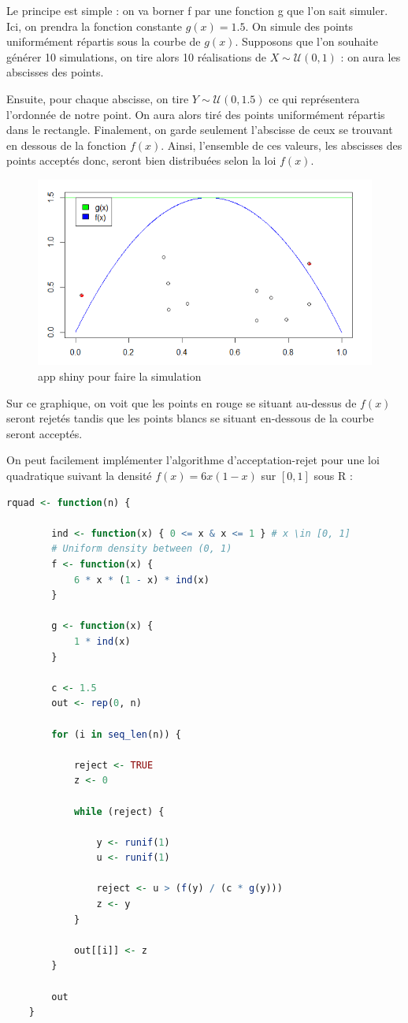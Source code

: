 \documentclass[10pt]{article} %
\begin{document}
Le principe est simple : on va borner f par une fonction g que l'on sait simuler. Ici, on prendra la fonction constante $g(x) = 1.5 $. On simule des points uniformément répartis sous la courbe de $g(x)$. Supposons que l'on souhaite générer 10 simulations, on tire alors 10 réalisations de $X \sim \mathcal{U}(0, 1)$ : on aura les abscisses des points.

Ensuite, pour chaque abscisse, on tire $Y \sim \mathcal{U}(0, 1.5)$ ce qui représentera l'ordonnée de notre point. On aura alors tiré des points uniformément répartis dans le rectangle. Finalement, on garde seulement l'abscisse de ceux se trouvant en dessous de la fonction $f(x)$. Ainsi, l'ensemble de ces valeurs, les abscisses des points acceptés donc, seront bien distribuées selon la loi $f(x)$.

\begin{figure}[h!]
    \centering
    \includegraphics[width=.7\linewidth]{media/graph_acceptation_rejet.png}
    \caption{app shiny pour faire la simulation}
\end{figure}

Sur ce graphique, on voit que les points en rouge se situant au-dessus de $f(x)$ seront rejetés tandis que les points blancs se situant en-dessous de la courbe seront acceptés.

On peut facilement implémenter l'algorithme d'acceptation-rejet pour une loi quadratique suivant la densité $f(x) = 6x(1 - x)$ sur $[0, 1]$ sous R :
\begin{lstlisting}[language=R]
    rquad <- function(n) {

        ind <- function(x) { 0 <= x & x <= 1 } # x \in [0, 1]
        # Uniform density between (0, 1)
        f <- function(x) {
            6 * x * (1 - x) * ind(x)
        }

        g <- function(x) {
            1 * ind(x)
        }

        c <- 1.5
        out <- rep(0, n)

        for (i in seq_len(n)) {

            reject <- TRUE
            z <- 0

            while (reject) {

                y <- runif(1)
                u <- runif(1)

                reject <- u > (f(y) / (c * g(y)))
                z <- y
            }

            out[[i]] <- z
        }

        out
    }
\end{lstlisting}
\end{document}

